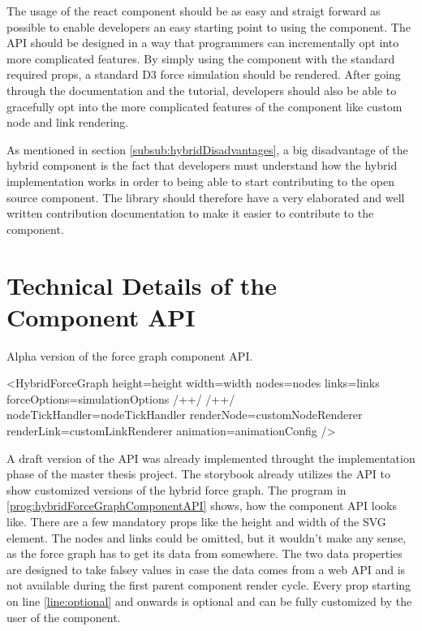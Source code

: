 The usage of the react component should be as easy and straigt forward as possible to enable developers an easy starting point to using the component. The API should be designed in a way that programmers can incrementally opt into more complicated features. By simply using the component with the standard required props, a standard D3 force simulation should be rendered. After going through the documentation and the tutorial, developers should also be able to gracefully opt into the more complicated features of the component like custom node and link rendering.

As mentioned in section \ref{subsub:hybridDisadvantages}, a big disadvantage of the hybrid component is the fact that developers must understand how the hybrid implementation works in order to being able to start contributing to the open source component. The library should therefore have a very elaborated and well written contribution documentation to make it easier to contribute to the component.

\section{Technical Details of the Component API}

\begin{program}
\caption{Alpha version of the force graph component API.}
\label{prog:hybridForceGraphComponentAPI}
\begin{JsCode}
<HybridForceGraph 
  height={height}
  width={width}
  nodes={nodes}
  links={links}
  forceOptions={simulationOptions} /+\label{line:foceOptions}+/ /+\label{line:optional}+/ 
  nodeTickHandler={nodeTickHandler}
  renderNode={customNodeRenderer}
  renderLink={customLinkRenderer}
  animation={animationConfig}
/>
\end{JsCode}
\end{program}

A draft version of the API was already implemented throught the implementation phase of the master thesis project. The storybook already utilizes the API to show customized versions of the hybrid force graph. The program in \ref{prog:hybridForceGraphComponentAPI} shows, how the component API looks like. There are a few mandatory props like the height and width of the SVG element. The nodes and links could be omitted, but it wouldn't make any sense, as the force graph has to get its data from somewhere. The two data properties are designed to take falsey values in case the data comes from a web API and is not available during the first parent component render cycle. Every prop starting on line \ref{line:optional} and onwards is optional and can be fully customized by the user of the component.

